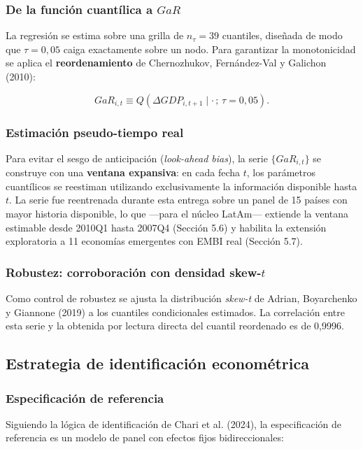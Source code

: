 \documentclass[5p,times,twocolumn,authoryear]{elsarticle}
\begin{document}
\subsubsection{De la función cuantílica a $GaR$}

La regresión se estima sobre una grilla de $n_\tau = 39$ cuantiles, diseñada de modo que $\tau = 0{,}05$ caiga exactamente sobre un nodo. Para garantizar la monotonicidad se aplica el \textbf{reordenamiento} de Chernozhukov, Fernández-Val y Galichon (2010):

\[ GaR_{i,t} \equiv Q\!\left(\Delta GDP_{i,t+1}\mid \cdot\,;\,\tau = 0{,}05\right). \]

\subsubsection{Estimación pseudo-tiempo real}

Para evitar el sesgo de anticipación (\textit{look-ahead bias}), la serie $\{GaR_{i,t}\}$ se construye con una \textbf{ventana expansiva}: en cada fecha $t$, los parámetros cuantílicos se reestiman utilizando exclusivamente la información disponible hasta $t$. La serie fue reentrenada durante esta entrega sobre un panel de 15 países con mayor historia disponible, lo que —para el núcleo LatAm— extiende la ventana estimable desde 2010Q1 hasta 2007Q4 (Sección 5.6) y habilita la extensión exploratoria a 11 economías emergentes con EMBI real (Sección 5.7).

\subsubsection{Robustez: corroboración con densidad skew-$t$}

Como control de robustez se ajusta la distribución \textit{skew-t} de Adrian, Boyarchenko y Giannone (2019) a los cuantiles condicionales estimados. La correlación entre esta serie y la obtenida por lectura directa del cuantil reordenado es de 0,9996.

\subsection{Estrategia de identificación econométrica}

\subsubsection{Especificación de referencia}

Siguiendo la lógica de identificación de Chari et al. (2024), la especificación de referencia es un modelo de panel con efectos fijos bidireccionales:
\end{document}
